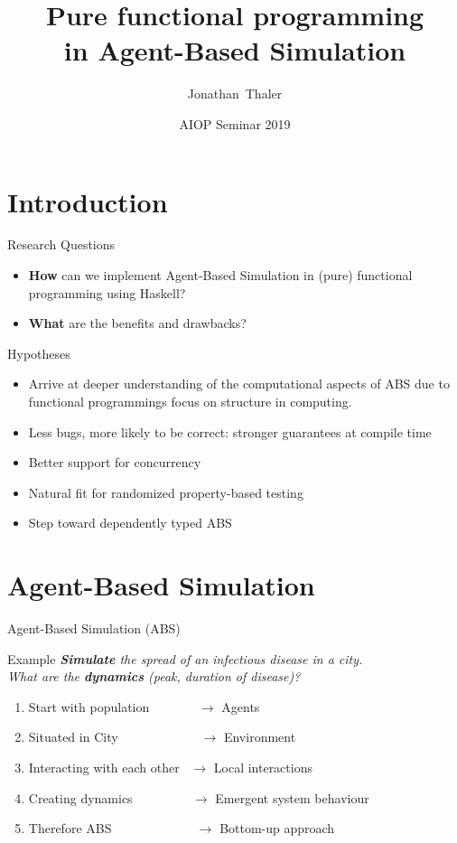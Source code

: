 \documentclass{beamer}
\title[Pure functional programming in Agent-Based Simulation] 
{%
  Pure functional programming \\ in Agent-Based Simulation
}
\author[Thaler]
{
  Jonathan~Thaler
}
\institute[University of Nottingham, Ningbo, China]
{
  University of Nottingham, Ningbo, China
}
\date[AIOP Seminar 2019]
{AIOP Seminar 2019}
\begin{document}
\begin{frame}
  \titlepage
\end{frame}

\section{Introduction}
\begin{frame}{Research Questions}
\begin{itemize}
  \item \textbf{How} can we implement Agent-Based Simulation in (pure) functional programming using Haskell?
  \item \textbf{What} are the benefits and drawbacks?
\end{itemize}
\end{frame}

\begin{frame}{Hypotheses}
\begin{itemize}
  \item Arrive at deeper understanding of the computational aspects of ABS due to functional programmings focus on structure in computing. 
  \item Less bugs, more likely to be correct: stronger guarantees at compile time
  \item Better support for concurrency
  \item Natural fit for randomized property-based testing
  \item Step toward dependently typed ABS
\end{itemize}
\end{frame}

\section{Agent-Based Simulation}
\begin{frame}{Agent-Based Simulation (ABS)} 
  \begin{block}{Example}
    \textit{\textbf{Simulate} the spread of an infectious disease in a city. \\ What are the \textbf{dynamics} (peak, duration of disease)?}
  \end{block}
  
  \begin{enumerate}
    \item Start with population \, \, \, \, \, \, \, $\to$ Agents
 	\item Situated in City \, \, \, \, \, \, \, \, \, \, \, \,\, $\to$ Environment
 	\item Interacting with each other \, $\to$ Local interactions
 	\item Creating dynamics \, \, \, \, \, \, \, \,\,\, $\to$ Emergent system behaviour
 	\item Therefore ABS \, \, \, \, \, \, \, \, \, \, \, \,\,\, $\to$ Bottom-up approach
  \end{enumerate}
\end{frame}
\end{document}

